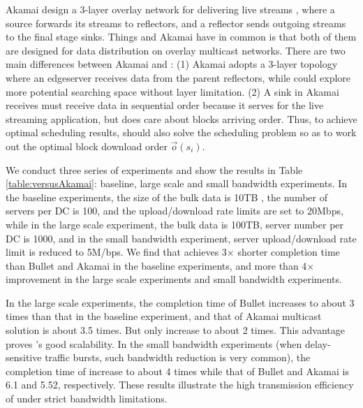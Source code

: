 Akamai design a 3-layer overlay network for delivering live streams \cite{Andreev2013Designing}, where a source forwards its streams to reflectors, and a reflector sends outgoing streams to the final stage sinks. Things \name and Akamai have in common is that both of them are designed for data distribution on overlay multicast networks. There are two main differences  between Akamai and \name: (1) Akamai adopts a 3-layer topology where an edgeserver receives data from the parent reflectors, while \name could explore more potential searching space without layer limitation. (2) A sink in Akamai receives must receive data in sequential order because it serves for the live streaming application, but \name does care about blocks arriving order. Thus, to achieve optimal scheduling results, \name should also solve the scheduling problem so as to work out the optimal block download order $\overrightarrow{o}(s_i)$.

We conduct three series of experiments and show the results in Table \ref{table:versusAkamai}: baseline, large scale and small bandwidth experiments. In the baseline experiments, the size of the bulk data is 10TB , the number of servers per DC is 100, and the upload/download rate limits are set to 20Mbps, while in the large scale experiment, the bulk data is 100TB, server number per DC is 1000, and in the small bandwidth experiment, server upload/download rate limit is reduced to 5M/bps. We find that \name achieves 3$\times$ shorter completion time than Bullet and Akamai in the baseline experiments, and more than 4$\times$ improvement in the large scale experiments and small bandwidth experiments.

In the large scale experiments, the completion time of Bullet increases to about 3 times than that in the baseline experiment, and that of Akamai multicast solution is about 3.5 times. But \name only increase to about 2 times. This advantage proves \name's good scalability. In the small bandwidth experiments (when delay-sensitive traffic bursts, such bandwidth reduction is very common), the completion time of \name increase to about 4 times while that of Bullet and Akamai is 6.1 and 5.52, respectively. These results illustrate the high transmission efficiency of \name under strict bandwidth limitations.

